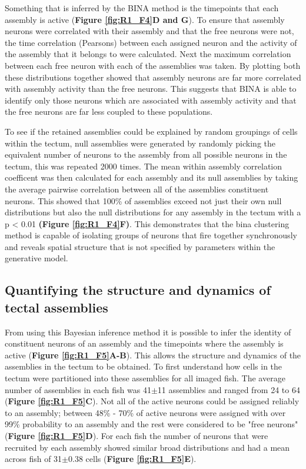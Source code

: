 Something that is inferred by the BINA method is the timepoints that each assembly is active (\textbf{Figure \ref{fig:R1_F4}D and G}). To ensure that assembly neurons were  correlated with their assembly and that the free neurons were not, the time correlation (Pearsons) between each assigned neuron and the activity of the assembly that it belongs to were calculated. Next the maximum correlation between each free neuron with each of the assemblies was taken. By plotting both these distributions together showed that assembly neurons are far more correlated with assembly activity than the free neurons. This suggests that BINA is able to identify only those neurons which are associated with assembly activity and that the free neurons are far less coupled to these populations.

To see if the retained assemblies could be explained by random groupings of cells within the tectum, null assemblies were generated by randomly picking the equivalent number of neurons to the assembly from all possible neurons in the tectum, this was repeated 2000 times. The mean within assembly correlation coefficent was then calculated for each assembly and its null assemblies by taking the average pairwise correlation between all of the assemblies constituent neurons. This showed that 100\% of assemblies exceed not just their own null distributions but also the null distributions for any assembly in the tectum with a p < 0.01 \textbf{(Figure \ref{fig:R1_F4}F)}. This demonstrates that the \gls{bina} clustering method is capable of isolating groups of neurons that fire together synchronously and reveals spatial structure that is not specified by parameters within the generative model. 
 
\subsection{Quantifying the structure and dynamics of tectal assemblies}
From using this Bayesian inference method it is possible to infer the identity of constituent neurons of an assembly and the timepoints where the assembly is active (\textbf{Figure \ref{fig:R1_F5}A-B}). This allows the structure and dynamics of the assemblies in the tectum to be obtained. To first understand how cells in the tectum were partitioned into these assemblies for all imaged fish. The average number of assemblies in each fish was 41$\pm$11 assemblies and ranged from 24 to 64 (\textbf{Figure \ref{fig:R1_F5}C}). Not all of the active neurons could be assigned reliably to an assembly; between 48\% - 70\% of active neurons were assigned with over 99\% probability to an assembly and the rest were considered to be "free neurons" (\textbf{Figure \ref{fig:R1_F5}D}).  For each fish the number of neurons that were recruited by each assembly showed similar broad distributions and had a mean across fish of 31$\pm$0.38 cells (\textbf{Figure \ref{fig:R1_F5}E}). 

